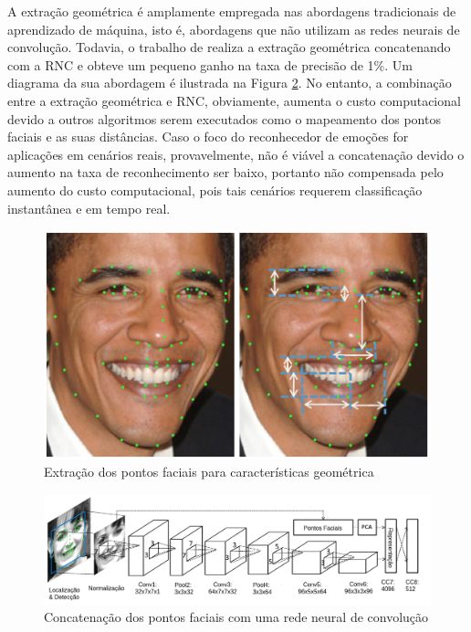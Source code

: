 A extração geométrica é amplamente empregada nas abordagens tradicionais de aprendizado de máquina, isto é, abordagens que não utilizam as redes neurais de convolução. Todavia, o trabalho de \cite{art11} realiza a extração geométrica concatenando com a RNC e obteve um pequeno ganho na taxa de precisão de 1\%. Um diagrama da sua abordagem é ilustrada na Figura \ref{fig:yun-customizing}. No entanto, a combinação entre a extração geométrica e RNC, obviamente, aumenta o custo computacional devido a outros algoritmos serem executados como o mapeamento dos pontos faciais e as suas distâncias. Caso o foco do reconhecedor de emoções for aplicações em cenários reais, provavelmente, não é viável a concatenação devido o aumento na taxa de reconhecimento ser baixo, portanto não compensada pelo aumento do custo computacional, pois tais cenários requerem classificação instantânea e em tempo real.

\begin{figure}
\centering
\includegraphics[scale=0.45]{figuras/tipogeo.png}
\caption{Extração dos pontos faciais para características geométrica}
\label{fig:geometrica}
\end{figure}

\begin{figure}
\centering
\includegraphics[scale=0.48]{figuras/yun-customizing.png}
\caption{Concatenação dos pontos faciais com uma rede neural de convolução}
\label{fig:yun-customizing}
\end{figure}



